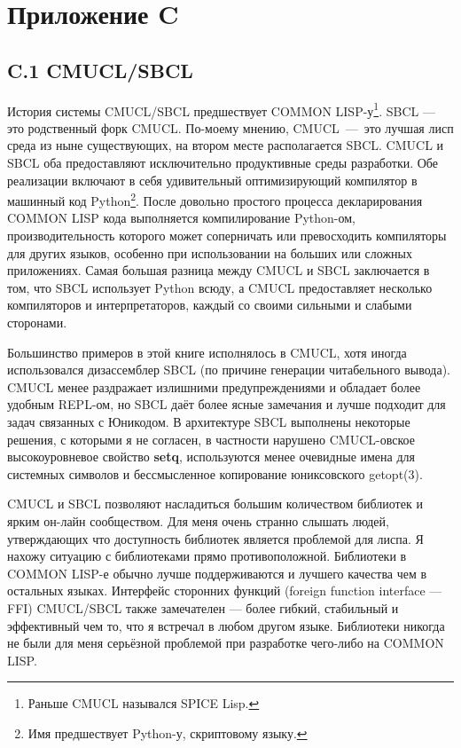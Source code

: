 \chapter*{Приложение C}

\section*{C.1 CMUCL/SBCL}

История системы CMUCL/SBCL предшествует COMMON LISP-у\footnote[1]{Раньше CMUCL назывался SPICE Lisp.}. SBCL --- это родственный форк CMUCL. По-моему мнению, CMUCL~---~это лучшая лисп среда из ныне существующих, на втором месте располагается SBCL. CMUCL и SBCL оба предоставляют исключительно продуктивные среды разработки. Обе реализации включают в себя удивительный оптимизирующий компилятор в машинный код Python\footnote[2]{Имя предшествует Python-у, скриптовому языку.}. После довольно простого процесса декларирования COMMON LISP кода выполняется компилирование Python-ом, производительность которого может соперничать или превосходить компиляторы для других языков, особенно при использовании на больших или сложных приложениях. Самая большая разница между CMUCL и SBCL заключается в том, что SBCL использует Python всюду, а CMUCL предоставляет несколько компиляторов и интерпретаторов, каждый со своими сильными и слабыми сторонами.

Большинство примеров в этой книге исполнялось в CMUCL, хотя иногда использовался дизассемблер SBCL (по причине генерации читабельного вывода). CMUCL менее раздражает излишними предупреждениями и обладает более удобным REPL-ом, но SBCL даёт более ясные замечания и лучше подходит для задач связанных с Юникодом. В архитектуре SBCL выполнены некоторые решения, с которыми я не согласен, в частности нарушено CMUCL-овское высокоуровневое свойство \textbf{setq}, используются менее очевидные имена для системных символов и бессмысленное копирование юниксовского getopt(3).

CMUCL и SBCL позволяют насладиться большим количеством библиотек и ярким он-лайн сообществом. Для меня очень странно слышать людей, утверждающих что доступность библиотек является проблемой для лиспа. Я нахожу ситуацию с библиотеками прямо противоположной. Библиотеки в COMMON LISP-е обычно лучше поддерживаются и лучшего качества чем в остальных языках. Интерфейс сторонних функций (foreign function interface --- FFI) CMUCL/SBCL также замечателен --- более гибкий, стабильный и эффективный чем то, что я встречал в любом другом языке. Библиотеки никогда не были для меня серьёзной проблемой при разработке чего-либо на COMMON LISP.

